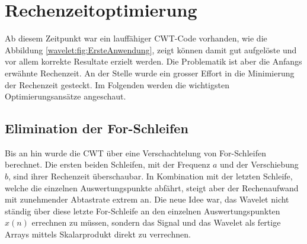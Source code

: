 %
%
%
%
\section{Rechenzeitoptimierung
\label{wavelets:section:teil3}}
Ab diesem Zeitpunkt war ein lauffähiger CWT-Code vorhanden, wie die
Abbildung \ref{wavelet:fig:ErsteAnwendung}, zeigt können damit gut
aufgelöste und vor allem korrekte Resultate erzielt werden.
Die Problematik ist aber die Anfangs erwähnte Rechenzeit.
An der Stelle wurde ein grosser Effort in die Minimierung der
Rechenzeit gesteckt.
Im Folgenden werden die wichtigsten Optimierungsansätze angeschaut.



\subsection{Elimination der For-Schleifen
	\label{wavelets:subsection:EliminationForSchlaufen}}
Bis an hin wurde die CWT über eine Verschachtelung von For-Schleifen
berechnet.
Die ersten beiden Schleifen, mit der Frequenz $a$ und der Verschiebung
$b$, sind ihrer Rechenzeit überschaubar.
In Kombination mit der letzten Schleife, welche die einzelnen
Auswertungspunkte abfährt, steigt aber der Rechenaufwand mit
zunehmender Abtastrate extrem an.
Die neue Idee war, das Wavelet nicht ständig über diese letzte
For-Schleife an den einzelnen Auswertungspunkten $x(n)$ errechnen
zu müssen, sondern das Signal und das Wavelet als fertige Arrays
mittels Skalarprodukt direkt zu verrechnen.


